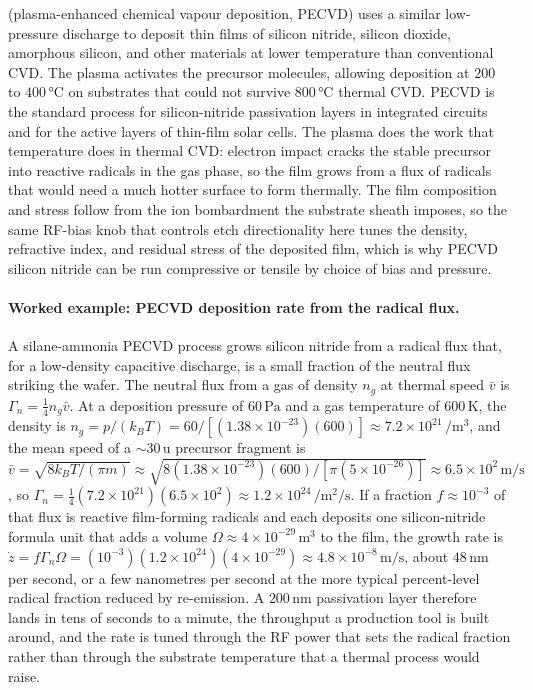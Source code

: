  (plasma-enhanced chemical vapour
deposition, PECVD) uses a similar low-pressure discharge to deposit
thin films of silicon nitride, silicon dioxide, amorphous silicon,
and other materials at lower temperature than conventional CVD. The
plasma activates the precursor molecules, allowing deposition at
$200$ to $400\,\si{\celsius}$ on substrates that could not survive
$800\,\si{\celsius}$ thermal CVD. PECVD is the standard process for
silicon-nitride passivation layers in integrated circuits and for
the active layers of thin-film solar cells. The plasma does the work that
temperature does in thermal CVD: electron impact cracks the stable precursor
into reactive radicals in the gas phase, so the film grows from a flux of
radicals that would need a much hotter surface to form thermally. The film
composition and stress follow from the ion bombardment the substrate sheath
imposes, so the same RF-bias knob that controls etch directionality here tunes
the density, refractive index, and residual stress of the deposited film, which
is why PECVD silicon nitride can be run compressive or tensile by choice of
bias and pressure.

\paragraph{Worked example: PECVD deposition rate from the radical flux.}
A silane-ammonia PECVD process grows silicon nitride from a radical flux that,
for a low-density capacitive discharge, is a small fraction of the neutral flux
striking the wafer. The neutral flux from a gas of density $n_g$ at thermal
speed $\bar{v}$ is $\Gamma_n = \tfrac14 n_g\bar{v}$. At a deposition pressure of
$60\,\si{\pascal}$ and a gas temperature of $600\,\si{\kelvin}$, the density is
$n_g = p/(k_B T) = 60/[(1.38\times 10^{-23})(600)] \approx 7.2\times
10^{21}\,\si{\per\meter\cubed}$, and the mean speed of a $\sim 30\,\text{u}$
precursor fragment is $\bar{v} = \sqrt{8k_B T/(\pi m)} \approx \sqrt{8(1.38
\times 10^{-23})(600)/[\pi(5\times 10^{-26})]} \approx 6.5\times 10^{2}\,\si{
\meter\per\second}$, so $\Gamma_n = \tfrac14(7.2\times 10^{21})(6.5\times
10^{2}) \approx 1.2\times 10^{24}\,\si{\per\meter\squared\per\second}$. If a
fraction $f \approx 10^{-3}$ of that flux is reactive film-forming radicals and
each deposits one silicon-nitride formula unit that adds a volume $\Omega
\approx 4\times 10^{-29}\,\si{\meter\cubed}$ to the film, the growth rate is
$\dot{z} = f\Gamma_n\Omega = (10^{-3})(1.2\times 10^{24})(4\times 10^{-29})
\approx 4.8\times 10^{-8}\,\si{\meter\per\second}$, about $48\,\si{\nano\meter}$
per second, or a few nanometres per second at the more typical percent-level
radical fraction reduced by re-emission. A $200\,\si{\nano\meter}$ passivation
layer therefore lands in tens of seconds to a minute, the throughput a
production tool is built around, and the rate is tuned through the RF power that
sets the radical fraction rather than through the substrate temperature that a
thermal process would raise.

